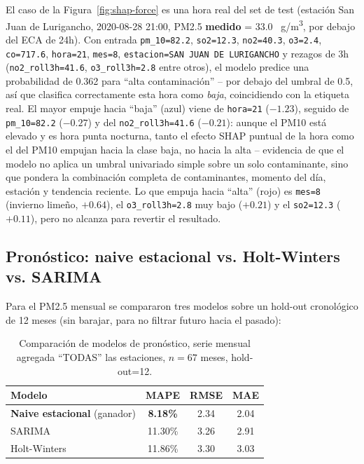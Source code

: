 \documentclass[11pt,a4paper]{article}
\begin{document}
El caso de la Figura~\ref{fig:shap-force} es una hora real del set de test (estación
San Juan de Lurigancho, 2020-08-28 21:00, PM2.5 \textbf{medido} = 33.0~\textmu
g/m\textsuperscript{3}, por debajo del ECA de 24h). Con entrada
\texttt{pm\_10=82.2}, \texttt{so2=12.3}, \texttt{no2=40.3}, \texttt{o3=2.4},
\texttt{co=717.6}, \texttt{hora=21}, \texttt{mes=8}, \texttt{estacion=SAN JUAN DE
LURIGANCHO} y rezagos de 3h (\texttt{no2\_roll3h=41.6}, \texttt{o3\_roll3h=2.8} entre
otros), el modelo predice una probabilidad de 0.362 para ``alta contaminación'' --
por debajo del umbral de 0.5, así que clasifica correctamente esta hora como
\emph{baja}, coincidiendo con la etiqueta real. El mayor empuje hacia ``baja''
(azul) viene de \texttt{hora=21} ($-1.23$), seguido de \texttt{pm\_10=82.2} ($-0.27$) y
del \texttt{no2\_roll3h=41.6} ($-0.21$): aunque el PM10 está elevado y es hora punta
nocturna, tanto el efecto SHAP puntual de la hora como el del PM10 empujan hacia la
clase baja, no hacia la alta -- evidencia de que el modelo no aplica un umbral
univariado simple sobre un solo contaminante, sino que pondera la combinación completa
de contaminantes, momento del día, estación y tendencia reciente. Lo que empuja hacia
``alta'' (rojo) es \texttt{mes=8} (invierno limeño, $+0.64$), el
\texttt{o3\_roll3h=2.8} muy bajo ($+0.21$) y el \texttt{so2=12.3} ($+0.11$), pero no
alcanza para revertir el resultado.

\subsection{Pronóstico: naive estacional vs. Holt-Winters vs. SARIMA}
\label{sec:pronostico}

Para el PM2.5 mensual se compararon tres modelos sobre un hold-out cronológico de 12
meses (sin barajar, para no filtrar futuro hacia el pasado):

\begin{table}[h!]
\centering
\small
\begin{tabular}{@{}lccc@{}}
\toprule
\textbf{Modelo} & \textbf{MAPE} & \textbf{RMSE} & \textbf{MAE} \\
\midrule
\textbf{Naive estacional} (ganador) & \textbf{8.18\%} & 2.34 & 2.04 \\
SARIMA & 11.30\% & 3.26 & 2.91 \\
Holt-Winters & 11.86\% & 3.30 & 3.03 \\
\bottomrule
\end{tabular}
\caption{Comparación de modelos de pronóstico, serie mensual agregada ``TODAS'' las estaciones, $n=67$ meses, hold-out=12.}
\end{table}
\end{document}
